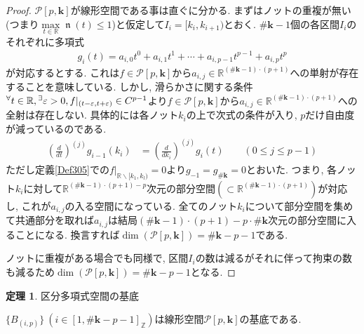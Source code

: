 \documentclass{jsarticle}
\newcommand\setR{\mathbb{R}}
\newcommand\subknot[1]{{#1}^*}
\newcommand\Pare[1]{\left(#1\right)}
\newcommand\curl[1]{\{#1\}}
\newcommand\squa[1]{[#1]}
\newcommand\E[1]{\!\,{\vphantom{#1}}^\exists #1}
\newcommand\A[1]{\!\,{\vphantom{#1}}^\forall #1}
\newcommand\Z[2]{\squa{#1,#2}_\mathbb{Z}}
\newcommand\od[2]{\frac{d #1}{d #2}}
\DeclareMathOperator{\N}{\mathfrak{n}}
\theoremstyle{definition}%
\newtheorem{thm}{定理}
\newcommand\UC{\textcolor{red}{(執筆中です)}}
\begin{document}
\begin{proof}
    $\mathcal{P}[p, \bm{k}]$が線形空間である事は直ぐに分かる.
    まずはノットの重複が無い(つまり$\max\limits_{t\in\setR}\N(t)\le 1$)と仮定して$I_i=[k_{i}, k_{i+1})$とおく.
    $\# \bm{k}-1$個の各区間$I_i$のそれぞれに多項式
    \begin{align}
        g_{i}(t)=a_{i,0}t^{0}+a_{i,1}t^{1}+\cdots+a_{i,p-1}t^{p-1}+a_{i,p}t^{p}
    \end{align}
    が対応するとする.
    これは$f\in \mathcal{P}[p,\bm{k}]$から$a_{i,j}\in \setR^{(\# \bm{k}-1)\cdot(p+1)}$への単射が存在することを意味している.
    しかし, 滑らかさに関する条件$\A t\in\setR, \E \varepsilon>0, f|_{(t-\varepsilon,t+\varepsilon)}\in C^{p-1}$より$f\in \mathcal{P}[p,\bm{k}]$から$a_{i,j}\in \setR^{(\# \bm{k}-1)\cdot(p+1)}$への全射は存在しない.
    具体的には各ノット$k_i$の上で次式の条件が入り, $p$だけ自由度が減っているのである.
    \begin{align}
        \Pare{\od{}{t}}^{(j)}g_{i-1}(k_{i})&=\Pare{\od{}{k_{i}}}^{(j)}g_{i}(t) \qquad (0 \le j \le p-1)
    \end{align}
    ただし定義\ref{Def305}での$f|_{\mathbb{R}\backslash[k_1,k_l)}=0$より$g_{-1}=g_{\# \bm{k}}=0$とおいた.
    つまり, 各ノット$k_i$に対して$\setR^{(\# \bm{k}-1)\cdot(p+1)-p}$次元の部分空間$(\subset \setR^{(\# \bm{k}-1)\cdot(p+1)})$が対応し, これが$a_{i,j}$の入る空間になっている.
    全てのノット$k_i$について部分空間を集めて共通部分を取れば$a_{i,j}$は結局$(\# \bm{k}-1)\cdot(p+1)-p\cdot \#\bm{k}$次元の部分空間に入ることになる.
    換言すれば$\dim\Pare{\mathcal{P}[p,\bm{k}]}=\# \bm{k}-p-1$である.

    ノットに重複がある場合でも同様で, 区間$I_i$の数は減るがそれに伴って拘束の数も減るため$\dim\Pare{\mathcal{P}[p,\bm{k}]}=\# \bm{k}-p-1$となる.
\end{proof}

\begin{screen}
	\begin{thm}
        \label{Thm309}
		区分多項式空間の基底

		$\curl{B_{(i,p)}} \ (i\in \Z{1}{\#{\bm{k}}-p-1})$は線形空間$\mathcal{P}[p, \bm{k}]$の基底である.
	\end{thm}
\end{screen}
\end{document}
